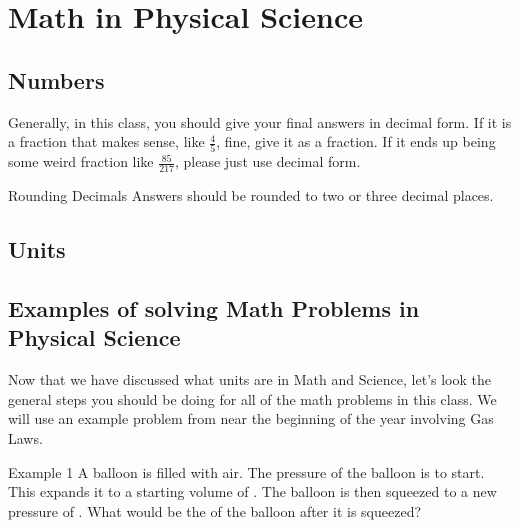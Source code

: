 \documentclass[../main.tex]{subfiles}
\begin{document}
\chapter{Math in Physical Science}

\section{Numbers}

Generally, in this class, you should give your final answers in decimal form.  If it is a fraction that makes sense, like \(\frac{4}{5}\), fine, give it as a fraction.  If it ends up being some weird fraction like \(\frac{85}{217}\), please just use decimal form.\\

\begin{boxPink}{Rounding Decimals}
	Answers should be rounded to two or three decimal places.
\end{boxPink}

\section{Units}

\section{Examples of solving Math Problems in Physical Science}

Now that we have discussed what units are in Math and Science, let's look the general steps you should be doing for all of the math problems in this class.  We will use an example problem from near the beginning of the year involving Gas Laws.

\begin{boxMassillon}{Example 1}
	A balloon is filled with air.  The pressure of the balloon is  to start.  This expands it to a starting volume of .  The balloon is then squeezed to a new pressure of .  What would be the  of the balloon after it is squeezed?
\end{boxMassillon}
\end{document}
